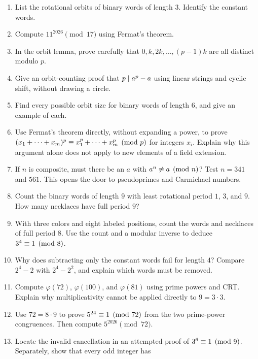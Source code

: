 \begin{exercisebox}
\begin{enumerate}
  \item List the rotational orbits of binary words of length $3$. Identify the constant words. 
  \item Compute $11^{2026}\pmod{17}$ using Fermat's theorem. 
  \item In the orbit lemma, prove carefully that $0,k,2k,\dots,(p-1)k$ are all distinct modulo $p$. 
  \item Give an orbit-counting proof that $p\mid a^p-a$ using linear strings and cyclic shift, without drawing a circle. 
  \item Find every possible orbit size for binary words of length $6$, and give an example of each. 
  \item Use Fermat's theorem directly, without expanding a power, to
  prove $(x_1+\cdots+x_m)^p\equiv x_1^p+\cdots+x_m^p\pmod p$
  for integers $x_i$. Explain why this argument alone does not apply
  to new elements of a field extension. 
  \item If $n$ is composite, must there be an $a$ with $a^n\not\equiv a\pmod n$? Test $n=341$ and $561$. This opens the door to pseudoprimes and Carmichael numbers. 
  \item Count the binary words of length $9$ with least rotational
  period $1$, $3$, and $9$. How many necklaces have full period $9$?
  \item With three colors and eight labeled positions, count the
  words and necklaces of full period $8$. Use the count and a modular
  inverse to deduce $3^4\equiv1\pmod8$. 
  \item Why does subtracting only the constant words fail for length
  $4$? Compare $2^4-2$ with $2^4-2^2$, and explain which words must
  be removed. 
  \item Compute $\varphi(72)$, $\varphi(100)$, and $\varphi(81)$
  using prime powers and CRT. Explain why multiplicativity cannot
  be applied directly to $9=3\cdot3$. 
  \item Use $72=8\cdot9$ to prove $5^{24}\equiv1\pmod{72}$
  from the two prime-power congruences. Then compute
  $5^{2026}\pmod{72}$. 
  \item Locate the invalid cancellation in an attempted proof of
  $3^6\equiv1\pmod9$. Separately, show that every odd integer has

\end{enumerate}
\end{exercisebox}
